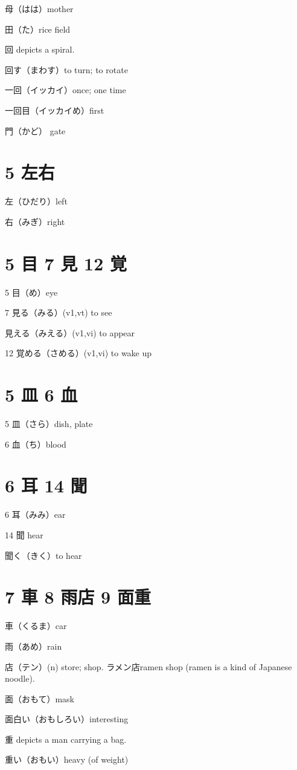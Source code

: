 母（はは）mother

田（た）rice field

回 depicts a spiral.

回す（まわす）to turn; to rotate

一回（イッカイ）once; one time

一回目（イッカイめ）first

門（かど） gate

\section{5 左右}

左（ひだり）left

右（みぎ）right

\section{5 目 7 見 12 覚}

5 目（め）eye

7 見る（みる）(v1,vt) to see

見える（みえる）(v1,vi) to appear

12 覚める（さめる）(v1,vi) to wake up

\section{5 皿 6 血}

5 皿（さら）dish, plate

6 血（ち）blood

\section{6 耳 14 聞}

6 耳（みみ）ear

14 聞 hear

聞く（きく）to hear

\section{7 車 8 雨店 9 面重}

車（くるま）car

雨（あめ）rain

店（テン）(n) store; shop.
ラメン店ramen shop (ramen is a kind of Japanese noodle).

面（おもて）mask

面白い（おもしろい）interesting

重 depicts a man carrying a bag.

重い（おもい）heavy (of weight)
